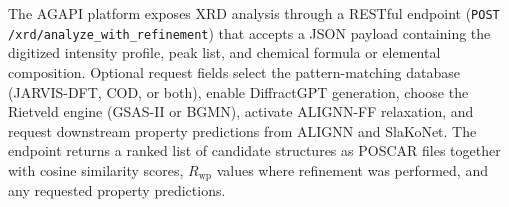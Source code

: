 \documentclass[pdflatex,sn-mathphys-num]{sn-jnl}
\theoremstyle{thmstyleone}
\theoremstyle{thmstyletwo}
\theoremstyle{thmstylethree}
\begin{document}
  The AGAPI platform exposes XRD analysis through a RESTful endpoint                                                                                                              
  (\texttt{POST /xrd/analyze\_with\_refinement}) that accepts a JSON payload                                                                                                      
  containing the digitized intensity profile, peak list, and chemical formula or                                                                                                  
  elemental composition. Optional request fields select the pattern-matching                                                                                                      
  database (JARVIS-DFT, COD, or both), enable DiffractGPT generation, choose the                                                                                                  
  Rietveld engine (GSAS-II or BGMN), activate ALIGNN-FF relaxation, and request                                                                                                   
  downstream property predictions from ALIGNN and SlaKoNet. The endpoint returns                                                                                                  
  a ranked list of candidate structures as POSCAR files together with cosine                                                                                                      
  similarity scores, $R_{\mathrm{wp}}$ values where refinement was performed,
  and any requested property predictions.                                                                                                                                         
                                                                                                                                                                                  
\end{document}
